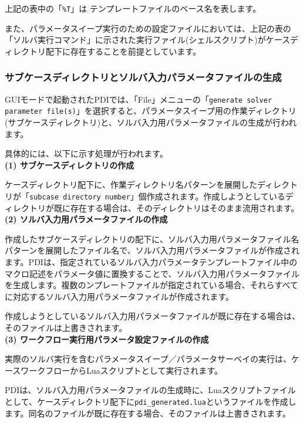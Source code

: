 \documentclass[a4paper,11pt]{jarticle}
\begin{document}
{上記の表中の「{\tt \%T}」は テンプレートファイルのベース名を表します。

また、パラメータスイープ実行のための設定ファイルにおいては、上記の表の「ソルバ実行コマンド」に示された実行ファイル(シェルスクリプト)がケースディレクトリ配下に存在することを前提としています。


\subsubsection{サブケースディレクトリとソルバ入力パラメータファイルの生成}

GUIモードで起動されたPDIでは、「File」メニューの「{\tt generate solver parameter file(s)}」を選択すると、パラメータスイープ用の作業ディレクトリ(サブケースディレクトリ)と、ソルバ入力用パラメータファイルの生成が行われます。

具体的には、以下に示す処理が行われます。\\

\textbf{(1) サブケースディレクトリの作成}

ケースディレクトリ配下に、作業ディレクトリ名パターンを展開したディレクトリが「{\tt subcase directory number}」個作成されます。作成しようとしているディレクトリが既に存在する場合は、そのディレクトリはそのまま流用されます。\\

\textbf{(2) ソルバ入力用パラメータファイルの作成}

作成したサブケースディレクトリの配下に、ソルバ入力用パラメータファイル名パターンを展開したファイル名で、ソルバ入力用パラメータファイルが作成されます。PDIは、指定されているソルバ入力パラメータテンプレートファイル中のマクロ記述をパラメータ値に置換することで、ソルバ入力用パラメータファイルを生成します。複数のンプレートファイルが指定されている場合、それらすべてに対応するソルバ入力用パラメータファイルが作成されます。

作成しようとしているソルバ入力用パラメータファイルが既に存在する場合は、そのファイルは上書きされます。\\

\textbf{(3) ワークフロー実行用パラメータ設定ファイルの作成}

実際のソルバ実行を含むパラメータスイープ／パラメータサーベイの実行は、ケースワークフローからLuaスクリプトとして実行されます。

PDIは、ソルバ入力用パラメータファイルの生成時に、Luaスクリプトファイルとして、ケースディレクトリ配下に{\tt pdi\_generated.lua}というファイルを作成します。同名のファイルが既に存在する場合、そのファイルは上書きされます。

}
\end{document}
